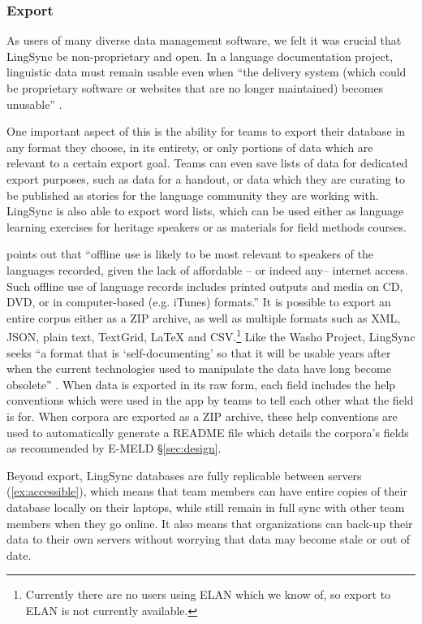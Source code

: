 \documentclass[letterpaper, 12pt, dvips]{mitwpl}
\begin{document}
\subsubsection{Export}

As users of many diverse data management software,
we felt it was crucial that LingSync be non-proprietary and open. In a language documentation project,  linguistic data must remain usable even when ``the delivery system (which could be proprietary software or websites that are no longer maintained) becomes unusable'' \citep[p.132]{Thieberger:2012}.

One important aspect of this is the ability for teams to export their database in any format they choose,
in its entirety, or only portions of data which are relevant to a certain export goal.
Teams can even save lists of data for dedicated export purposes,
such as data for a handout,
or data which they are curating to be published as stories for the language community they are working with.
LingSync is also able to export word lists,
which can be used either as language learning exercises for heritage speakers or as materials for field methods courses.

\cite{Thieberger:2012} points out that ``offline use is likely to be most relevant to speakers of the languages recorded, given the lack of affordable -- or indeed any-- internet access. Such offline use of language records includes printed outputs and media on CD, DVD, or in computer-based (e.g. iTunes) formats.'' 
It is possible to export an entire corpus either as a ZIP archive,
as well as multiple formats such as XML, JSON, plain text, TextGrid, LaTeX  and CSV.\footnote{Currently there are no users using ELAN which we know of, so export to ELAN is not currently available.} Like the Washo Project, LingSync seeks ``a format that is `self-documenting' so that it will be usable years after when the current technologies used to manipulate the data have long become obsolete'' \citep[p.4]{Cihlar:2008}. When data is exported in its raw form, each field includes the help conventions which were used in the app by teams to tell each other what the field is for. When corpora are exported as a ZIP archive, these help conventions are used to automatically generate a README file which details the corpora's fields as recommended by E-MELD \S \ref{sec:design}.

Beyond export,
LingSync databases are fully replicable between servers (\ref{ex:accessible}),
which means that team members can have entire copies of their database locally on their laptops,
while still remain in full sync with other team members when they go online.
It also means that organizations can back-up their data to their own servers without worrying that data may become stale or out of date.
\end{document}
